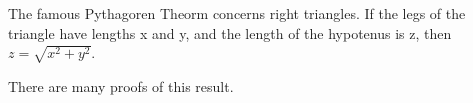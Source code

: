 \documentclass[11pt]{article}  %
\begin{document}

The famous Pythagoren Theorm concerns right triangles.  If the legs of
the triangle have lengths x and y, and the length of the hypotenus is z,
then $z = \sqrt{x^2+y^2}$.


There are many proofs of this result.
\end{document}
